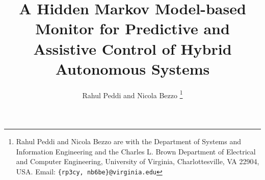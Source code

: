 \documentclass[letterpaper, 10 pt, conference]{ieeeconf}  %
\begin{document}
%
\title{\LARGE \bf A Hidden Markov Model-based Monitor for Predictive and Assistive Control of Hybrid Autonomous Systems}
\author{Rahul Peddi and Nicola Bezzo%
\thanks{Rahul Peddi and Nicola Bezzo are with the Department of Systems and Information Engineering and the Charles L. Brown Department of Electrical and Computer Engineering, University of Virginia, Charlottesville, VA 22904, USA. Email: {\tt \{rp3cy, nb6be\}@virginia.edu}}
}





\maketitle
\end{document}
